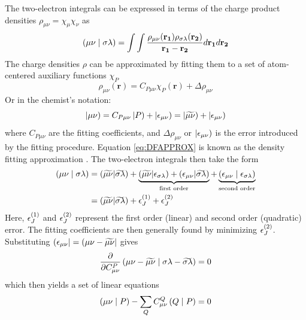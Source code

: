 The two-electron integrals can be expressed in terms of the charge product densities $\rho_{\mu\nu} = \chi_{\mu} \chi_{\nu}$ as
\begin{equation}
\left( \mu\nu \mid \sigma\lambda \right) = \int \int \frac{\rho_{\mu\nu}(\mathbf{r_1}) \rho_{\sigma\lambda}(\mathbf{r_2}) }{\mathbf{r_1} - \mathbf{r_2}} d\mathbf{r_1} d\mathbf{r_2}
\end{equation}
The charge densities $\rho$ can be approximated by fitting them to a set of atom-centered auxiliary functions $\chi_P$
\begin{equation}
\rho_{\mu\nu}(\mathbf{r}) = C_{P\mu\nu} \chi_{P}(\mathbf{r}) + \Delta \rho_{\mu\nu}
\end{equation}
\noindent Or in the chemist's notation:
\begin{equation}
\left\lvert \mu\nu \right) = C_{P\mu\nu} \left\lvert P \right) + \left\lvert \epsilon_{\mu\nu} \right) = \left\lvert \widetilde{\smash{\mu\nu}} \right) + \left\lvert \epsilon_{\mu\nu} \right)
\label{eq:DFAPPROX}
\end{equation}
\noindent where $C_{P\mu\nu}$ are the fitting coefficients, and $\Delta \rho_{\mu\nu}$ or $\left\lvert \epsilon_{\mu\nu} \right)$ is the error introduced by the fitting procedure. Equation \ref{eq:DFAPPROX} is known as the density fitting approximation \cite{Whi1973,Bae1973,Vah1993,Sky2000}. The two-electron integrals then take the form
\begin{equation}
\begin{split}
\left( \mu\nu \mid \sigma\lambda \right) &= (\widetilde{\smash{\mu\nu}}|\widetilde{\smash{\sigma\lambda}}) +  \underbrace{(\widetilde{\smash{\mu\nu}}|\epsilon_{\sigma\lambda}) + (\epsilon_{\mu\nu}|\widetilde{\smash{\sigma\lambda}})}_\textrm{first order} + \underbrace{\left( \epsilon_{\mu\nu} \mid \epsilon_{\sigma\lambda} \right)}_\textrm{second order} \\
&= (\widetilde{\smash{\mu\nu}}|\widetilde{\smash{\sigma\lambda}}) + \epsilon_J^{(1)} + \epsilon_J^{(2)} 
\end{split}
\label{eq:DFERROR}
\end{equation}
\noindent Here, $\epsilon_J^{(1)}$ and $\epsilon_J^{(2)}$ represent the first order (linear) and second order (quadratic) error. The fitting coefficients are then generally found by minimizing $\epsilon_J^{(2)}$. Substituting $\left( \smash{\epsilon_{\mu\nu}} \right\rvert = \left( \smash{\mu\nu - \widetilde{\smash{\mu\nu}}} \right\rvert$ gives
\begin{equation}
\frac{\partial}{\partial C^P_{\mu\nu}} \left( \smash{\mu\nu - \widetilde{\smash{\mu\nu}}} \mid \smash{\sigma\lambda - \widetilde{\smash{\sigma\lambda}}}\right) = 0
\end{equation}
\noindent which then yields a set of linear equations
\begin{equation}
\left( \smash{\mu\nu} \mid \smash{P}\right) - \sum_Q C^Q_{\mu\nu} \left( \smash{Q} \mid \smash{P}\right) = 0 
\label{eq:DFLLS}
\end{equation}
